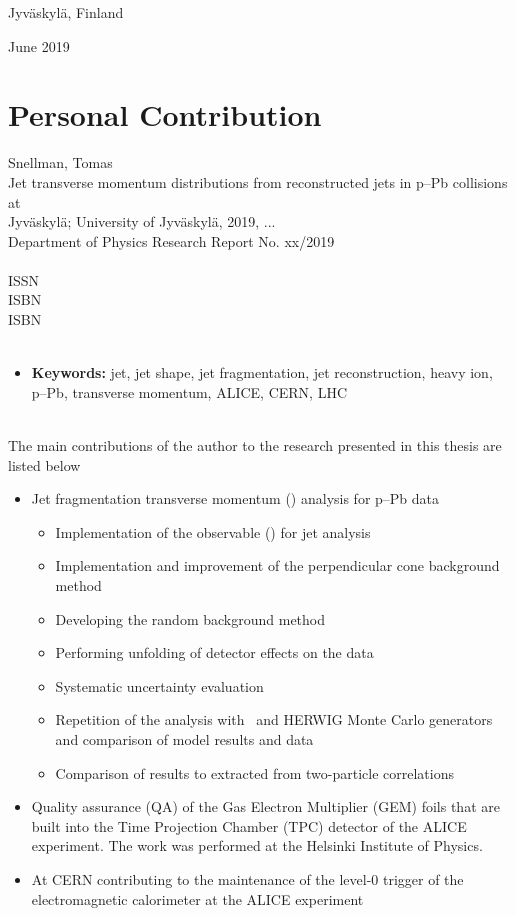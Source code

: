 \centerline{Jyv\"askyl\"a, Finland}
\centerline{June 2019}
\pagebreak
\thispagestyle{empty}
\section*{Personal Contribution} 

Snellman, Tomas \\
Jet transverse momentum distributions from reconstructed jets in p--Pb collisions at \\
Jyväskylä; University of Jyväskylä, 2019, ...\\
Department of Physics Research Report No. xx/2019\\~\\
ISSN\\
ISBN\\
ISBN\\
~\\
\begin{itemize}[label={},itemindent=-5em,leftmargin=5em]

\item {\bf Keywords:} jet, jet shape, jet fragmentation, jet reconstruction, heavy ion, p--Pb, transverse momentum, ALICE, CERN, LHC
\end{itemize}
~\\
The main contributions of the author to the research presented in this thesis are listed below
\begin{itemize}
\renewcommand\labelitemi{--}

\item Jet fragmentation transverse momentum (\jt{}) analysis for   p--Pb data
\begin{itemize}
\item Implementation of the observable (\jt{}) for jet analysis
\item Implementation and improvement of the perpendicular cone background method
\item Developing the random background method
\item Performing unfolding of detector effects on the data
\item Systematic uncertainty evaluation
\item Repetition of the analysis with \pythia~and HERWIG Monte Carlo generators and comparison of model results and data
\item Comparison of results to \jt{} extracted from two-particle correlations
\end{itemize}
\item Quality assurance (QA) of the Gas Electron Multiplier (GEM) foils that are built into the Time Projection Chamber (TPC) detector of the ALICE experiment. The work was performed at the Helsinki Institute of Physics.
\item At CERN contributing to the maintenance of the level-0 trigger of the electromagnetic calorimeter at the ALICE experiment
\end{itemize} 


